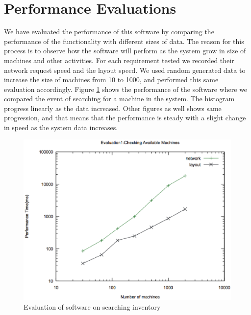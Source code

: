 \section{Performance Evaluations}
We have evaluated the performance of this software by comparing the performance of the functionality with different sizes of data. The reason for this process is to observe how the software will perform as the system grow in size of machines and other activities. For each requirement tested we recorded their network request speed and the  layout speed. We used random generated data to increase the size of machines from 10 to 1000, and performed this same evaluation accordingly. Figure \ref{available} shows the performance of the software where we compared the event of searching for a machine in the system. The histogram progress linearly as the data increased. Other figures as well shows same progression, and that means that the performance is steady with a slight change in speed as the system data increases.
\begin{figure}[h]
 \includegraphics[width=\linewidth]{available.eps}
  \caption{Evaluation of software on searching inventory}
  \label{available}
\end{figure}

